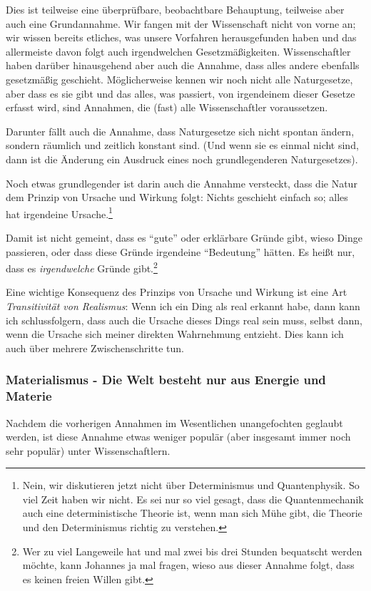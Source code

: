 Dies ist teilweise eine überprüfbare, beobachtbare Behauptung, teilweise aber auch eine Grundannahme. Wir fangen mit
der Wissenschaft nicht von vorne an; wir wissen bereits etliches, was unsere Vorfahren herausgefunden haben und das
allermeiste davon folgt auch irgendwelchen Gesetzmäßigkeiten. Wissenschaftler haben darüber hinausgehend aber auch
die Annahme, dass alles andere ebenfalls gesetzmäßig geschieht. Möglicherweise kennen wir noch nicht alle
Naturgesetze, aber dass es sie gibt und das alles, was passiert, von irgendeinem dieser Gesetze erfasst wird, sind
Annahmen, die (fast) alle Wissenschaftler voraussetzen.

Darunter fällt auch die Annahme, dass Naturgesetze sich nicht spontan ändern, sondern räumlich und zeitlich konstant sind. (Und
wenn sie es einmal nicht sind, dann ist die Änderung ein Ausdruck eines noch grundlegenderen Naturgesetzes).

Noch etwas grundlegender ist darin auch die Annahme versteckt, dass die Natur dem Prinzip von Ursache und Wirkung folgt:
Nichts geschieht einfach so; alles hat irgendeine Ursache.\footnote{Nein,
    wir diskutieren jetzt nicht über Determinismus und Quantenphysik. So viel Zeit haben wir nicht. Es sei nur so viel
    gesagt, dass die Quantenmechanik auch eine deterministische Theorie ist, wenn man sich Mühe gibt,
    die Theorie und den Determinismus richtig zu verstehen.}

Damit ist nicht gemeint, dass es \enquote{gute}
oder erklärbare Gründe gibt, wieso Dinge passieren, oder dass diese Gründe irgendeine \enquote{Bedeutung}
hätten. Es heißt nur, dass es \emph{irgendwelche} Gründe gibt.\footnote{Wer zu viel Langeweile hat und mal zwei bis drei Stunden bequatscht werden möchte, kann Johannes ja mal fragen, wieso aus dieser Annahme folgt, dass es keinen freien Willen gibt.}

Eine wichtige Konsequenz des Prinzips von Ursache und Wirkung ist eine Art \emph{Transitivität von Realismus}: Wenn ich ein Ding als real erkannt habe, dann kann ich schlussfolgern, dass auch die Ursache dieses Dings real sein muss, selbst dann, wenn die Ursache sich meiner direkten Wahrnehmung entzieht. Dies kann ich auch über mehrere Zwischenschritte tun.

\subsubsection{Materialismus - Die Welt besteht nur aus Energie und Materie}

Nachdem die vorherigen Annahmen im Wesentlichen unangefochten geglaubt werden, ist diese Annahme etwas weniger populär
(aber insgesamt immer noch sehr populär) unter Wissenschaftlern.

